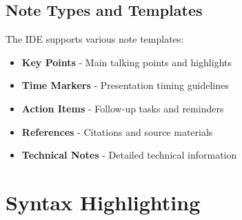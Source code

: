 \documentclass[11pt,a4paper]{article}
\begin{document}
\subsection{Note Types and Templates}
The IDE supports various note templates:
\begin{itemize}
    \item \textbf{Key Points} - Main talking points and highlights
    \item \textbf{Time Markers} - Presentation timing guidelines
    \item \textbf{Action Items} - Follow-up tasks and reminders
    \item \textbf{References} - Citations and source materials
    \item \textbf{Technical Notes} - Detailed technical information
\end{itemize}

\section{Syntax Highlighting}
\end{document}
